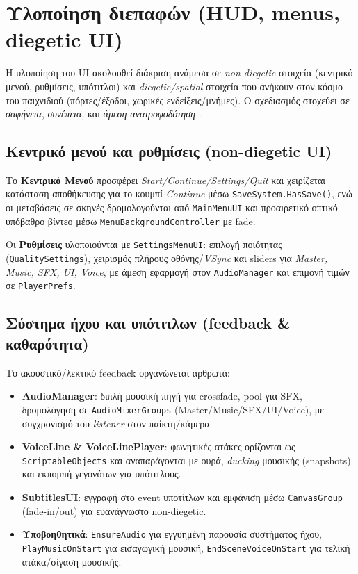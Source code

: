 \section{Υλοποίηση διεπαφών (HUD, menus, diegetic UI)}

Η υλοποίηση του UI ακολουθεί διάκριση ανάμεσα σε \textit{non-diegetic} στοιχεία (κεντρικό μενού, ρυθμίσεις, υπότιτλοι) και \textit{diegetic/spatial} στοιχεία που ανήκουν στον κόσμο του παιχνιδιού (πόρτες/έξοδοι, χωρικές ενδείξεις/μνήμες). Ο σχεδιασμός στοχεύει σε \emph{σαφήνεια}, \emph{συνέπεια},  και \emph{άμεση ανατροφοδότηση} .

\subsection{Κεντρικό μενού και ρυθμίσεις (non-diegetic UI)}
Το \textbf{Κεντρικό Μενού} προσφέρει \textit{Start/Continue/Settings/Quit} και χειρίζεται κατάσταση αποθήκευσης για το κουμπί \textit{Continue} μέσω \texttt{SaveSystem.HasSave()}, ενώ οι μεταβάσεις σε σκηνές δρομολογούνται από \texttt{MainMenuUI} και προαιρετικό οπτικό υπόβαθρο βίντεο μέσω \texttt{MenuBackgroundController} με fade. 

Οι \textbf{Ρυθμίσεις} υλοποιούνται με \texttt{SettingsMenuUI}: επιλογή ποιότητας (\texttt{QualitySettings}), χειρισμός πλήρους οθόνης/\textit{VSync} και sliders για \textit{Master, Music, SFX, UI, Voice}, με άμεση εφαρμογή στον \texttt{AudioManager} και επιμονή τιμών σε \texttt{PlayerPrefs}. 

\subsection{Σύστημα ήχου και υπότιτλων (feedback \& καθαρότητα)}
Το ακουστικό/λεκτικό feedback οργανώνεται αρθρωτά:
\begin{itemize}
  \item \textbf{AudioManager}: διπλή μουσική πηγή για crossfade, pool για SFX, δρομολόγηση σε \texttt{AudioMixerGroups} (Master/Music/SFX/UI/Voice), με συγχρονισμό του \textit{listener} στον παίκτη/κάμερα.
  \item \textbf{VoiceLine \& VoiceLinePlayer}: φωνητικές ατάκες ορίζονται ως \texttt{ScriptableObjects} και αναπαράγονται με ουρά, \textit{ducking} μουσικής (snapshots) και εκπομπή γεγονότων για υπότιτλους. 
  \item \textbf{SubtitlesUI}: εγγραφή στο event υποτίτλων και εμφάνιση μέσω \texttt{CanvasGroup} (fade-in/out) για ευανάγνωστο non-diegetic.
  \item \textbf{Υποβοηθητικά}: \texttt{EnsureAudio} για εγγυημένη παρουσία συστήματος ήχου, \texttt{PlayMusicOnStart} για εισαγωγική μουσική, \texttt{EndSceneVoiceOnStart} για τελική ατάκα/σίγαση μουσικής. 
\end{itemize}


